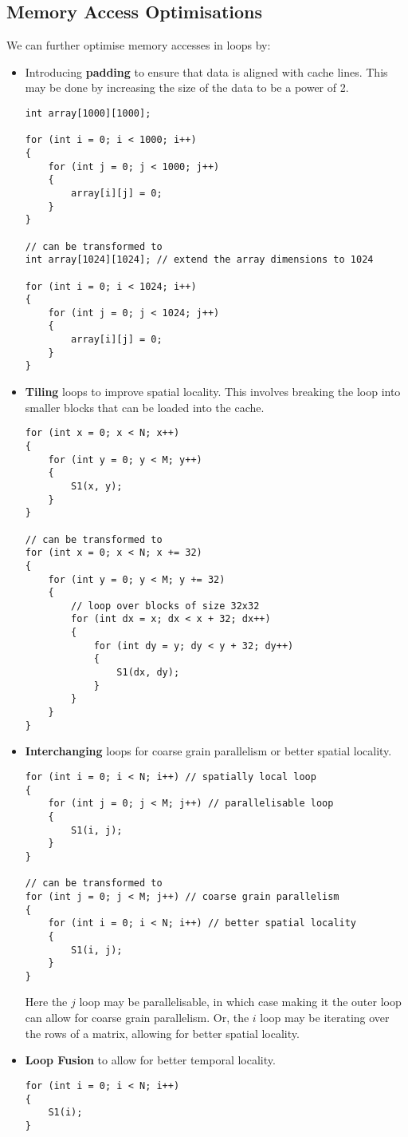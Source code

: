 \documentclass{article}
\begin{document}
\subsection{Memory Access Optimisations}
We can further optimise memory accesses in loops by:
\begin{itemize}
    \item Introducing \textbf{padding} to ensure that data is aligned
          with cache lines. This may be done by increasing the size of
          the data to be a power of 2.
          \begin{verbatim}
int array[1000][1000];

for (int i = 0; i < 1000; i++)
{
    for (int j = 0; j < 1000; j++)
    {
        array[i][j] = 0;
    }
}

// can be transformed to
int array[1024][1024]; // extend the array dimensions to 1024

for (int i = 0; i < 1024; i++)
{
    for (int j = 0; j < 1024; j++)
    {
        array[i][j] = 0;
    }
}
          \end{verbatim}
    \item \textbf{Tiling} loops to improve spatial locality. This involves
          breaking the loop into smaller blocks that can be loaded into
          the cache.
          \begin{verbatim}
for (int x = 0; x < N; x++)
{
    for (int y = 0; y < M; y++)
    {
        S1(x, y);
    }
}

// can be transformed to
for (int x = 0; x < N; x += 32)
{
    for (int y = 0; y < M; y += 32)
    {
        // loop over blocks of size 32x32
        for (int dx = x; dx < x + 32; dx++)
        {
            for (int dy = y; dy < y + 32; dy++)
            {
                S1(dx, dy);
            }
        }
    }
}
\end{verbatim}
    \item \textbf{Interchanging} loops for coarse grain parallelism or
          better spatial locality.
          \begin{verbatim}
for (int i = 0; i < N; i++) // spatially local loop
{
    for (int j = 0; j < M; j++) // parallelisable loop
    {
        S1(i, j);
    }
}

// can be transformed to
for (int j = 0; j < M; j++) // coarse grain parallelism
{
    for (int i = 0; i < N; i++) // better spatial locality
    {
        S1(i, j);
    }
}
\end{verbatim}
          Here the \(j\) loop may be parallelisable, in which case
          making it the outer loop can allow for coarse grain
          parallelism. Or, the \(i\) loop may be iterating over the
          rows of a matrix, allowing for better spatial locality.
    \item \textbf{Loop Fusion} to allow for better temporal locality.
          \begin{verbatim}
for (int i = 0; i < N; i++)
{
    S1(i);
}


\end{verbatim}
\end{itemize}
\end{document}

